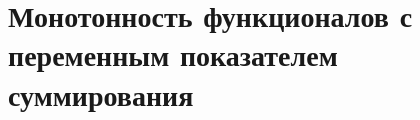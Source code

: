 \chapter{Монотонность функционалов с переменным показателем суммирования}
\label{chapt:variable}








